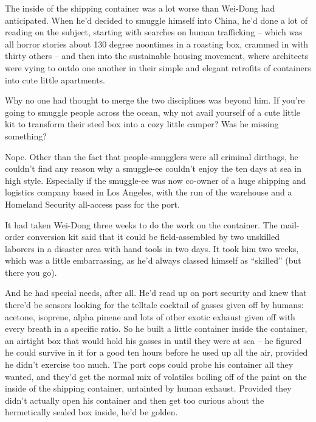 The inside of the shipping container was a lot worse than Wei-Dong
had anticipated. When he'd decided to smuggle himself into China,
he'd done a lot of reading on the subject, starting with searches
on human trafficking -- which was all horror stories about 130
degree noontimes in a roasting box, crammed in with thirty others
-- and then into the sustainable housing movement, where architects
were vying to outdo one another in their simple and elegant
retrofits of containers into cute little apartments.

Why no one had thought to merge the two disciplines was beyond him.
If you're going to smuggle people across the ocean, why not avail
yourself of a cute little kit to transform their steel box into a
cozy little camper? Was he missing something?

Nope. Other than the fact that people-smugglers were all criminal
dirtbags, he couldn't find any reason why a smuggle-ee couldn't
enjoy the ten days at sea in high style. Especially if the
smuggle-ee was now co-owner of a huge shipping and logistics
company based in Los Angeles, with the run of the warehouse and a
Homeland Security all-access pass for the port.

It had taken Wei-Dong three weeks to do the work on the container.
The mail-order conversion kit said that it could be field-assembled
by two unskilled laborers in a disaster area with hand tools in two
days. It took him two weeks, which was a little embarrassing, as
he'd always classed himself as ``skilled'' (but there you go).

And he had special needs, after all. He'd read up on port security
and knew that there'd be sensors looking for the telltale cocktail
of gasses given off by humans: acetone, isoprene, alpha pinene and
lots of other exotic exhaust given off with every breath in a
specific ratio. So he built a little container inside the
container, an airtight box that would hold his gasses in until they
were at sea -- he figured he could survive in it for a good ten
hours before he used up all the air, provided he didn't exercise
too much. The port cops could probe his container all they wanted,
and they'd get the normal mix of volatiles boiling off of the paint
on the inside of the shipping container, untainted by human
exhaust. Provided they didn't actually open his container and then
get too curious about the hermetically sealed box inside, he'd be
golden.

